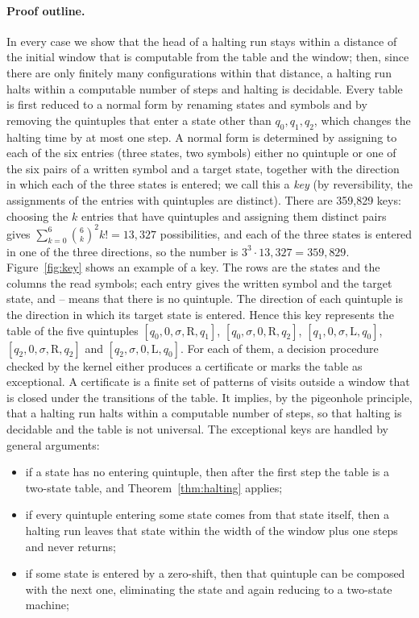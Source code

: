 \documentclass{article}
\theoremstyle{definition}
\theoremstyle{remark}
\newcommand{\rmL}{\mathrm{L}}
\newcommand{\rmR}{\mathrm{R}}
\begin{document}
\paragraph{Proof outline.}
In every case we show that the head of a halting run stays within a distance of the initial window that is computable from the table and the window; then, since there are only finitely many configurations within that distance, a halting run halts within a computable number of steps and halting is decidable.
Every table is first reduced to a normal form by renaming states and symbols and by removing the quintuples that enter a state other than $q_0,q_1,q_2$, which changes the halting time by at most one step.
A normal form is determined by assigning to each of the six entries (three states, two symbols) either no quintuple or one of the six pairs of a written symbol and a target state, together with the direction in which each of the three states is entered; we call this a \emph{key} (by reversibility, the assignments of the entries with quintuples are distinct). There are 359,829 keys: choosing the $k$ entries that have quintuples and assigning them distinct pairs gives $\sum_{k=0}^{6}\binom{6}{k}^2k!=13{,}327$ possibilities, and each of the three states is entered in one of the three directions, so the number is $3^3\cdot 13{,}327=359{,}829$.
Figure~\ref{fig:key} shows an example of a key. The rows are the states and the columns the read symbols; each entry gives the written symbol and the target state, and -- means that there is no quintuple.
The direction of each quintuple is the direction in which its target state is entered. Hence this key represents the table of the five quintuples $[q_0,0,\sigma,\rmR,q_1]$, $[q_0,\sigma,0,\rmR,q_2]$, $[q_1,0,\sigma,\rmL,q_0]$, $[q_2,0,\sigma,\rmR,q_2]$ and $[q_2,\sigma,0,\rmL,q_0]$.
For each of them, a decision procedure checked by the kernel either produces a certificate or marks the table as exceptional.
A certificate is a finite set of patterns of visits outside a window that is closed under the transitions of the table.
It implies, by the pigeonhole principle, that a halting run halts within a computable number of steps, so that halting is decidable and the table is not universal.
The exceptional keys are handled by general arguments:
\begin{itemize}
\item if a state has no entering quintuple, then after the first step the table is a two-state table, and Theorem~\ref{thm:halting} applies;
\item if every quintuple entering some state comes from that state itself, then a halting run leaves that state within the width of the window plus one steps and never returns;
\item if some state is entered by a zero-shift, then that quintuple can be composed with the next one, eliminating the state and again reducing to a two-state machine;
\end{itemize}
\end{document}

